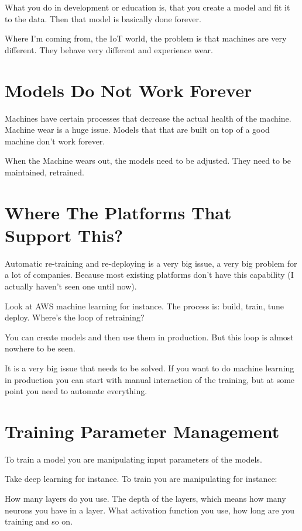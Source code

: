 \documentclass[12pt, numbers=noenddot]{scrreprt} %
\begin{document}
What you do in development or education is, that you create a model and fit it to the data. Then that model is basically done forever.

Where I’m coming from, the IoT world, the problem is that machines are very different. They behave very different and experience wear.

\section{Models Do Not Work Forever}

Machines have certain processes that decrease the actual health of the machine. Machine wear is a huge issue. Models that that are built on top of a good machine don’t work forever.

When the Machine wears out, the models need to be adjusted. They need to be maintained, retrained.


\section{Where The Platforms That Support This?}

Automatic re-training and re-deploying is a very big issue, a very big problem for a lot of companies. Because most existing platforms don’t have this capability (I actually haven't seen one until now).

Look at AWS machine learning for instance. The process is: build, train, tune deploy. Where’s the loop of retraining?

You can create models and then use them in production. But this loop is almost nowhere to be seen.

It is a very big issue that needs to be solved. If you want to do machine learning in production you can start with manual interaction of the training, but at some point you need to automate everything.

\section{Training Parameter Management}

To train a model you are manipulating input parameters of the models.

Take deep learning for instance. To train you are manipulating for instance:

How many layers do you use. The depth of the layers, which means how many neurons you have in a layer. What activation function you use, how long are you training and so on.
\end{document}
